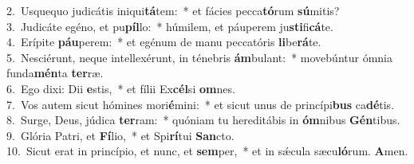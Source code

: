 {2.~}Usquequo judicátis iniqui\textbf{tá}tem:~* et fácies pecca\textbf{tó}rum \textbf{sú}mitis?\\
{3.~}Judicáte egéno, et pu\textbf{píl}lo:~* húmilem, et páuperem ju\textbf{sti}fi\textbf{cá}te.\\
{4.~}Erípite \textbf{páu}perem:~* et egénum de manu peccatóris \textbf{li}be\textbf{rá}te.\\
{5.~}Nesciérunt, neque intellexérunt, in ténebris \textbf{ám}bulant:~* movebúntur ómnia funda\textbf{mén}ta \textbf{ter}ræ.\\
{6.~}Ego dixi: Dii \textbf{e}stis,~* et fílii Ex\textbf{cél}si \textbf{om}nes.\\
{7.~}Vos autem sicut hómines mori\textbf{é}mini:~* et sicut unus de princípi\textbf{bus} ca\textbf{dé}tis.\\
{8.~}Surge, Deus, júdica \textbf{ter}ram:~* quóniam tu hereditábis in \textbf{óm}nibus \textbf{Gén}tibus.\\
{9.~}Glória Patri, et \textbf{Fí}lio,~* et Spi\textbf{rí}tui \textbf{San}cto.\\
{10.~}Sicut erat in princípio, et nunc, et \textbf{sem}per,~* et in sǽcula sæcu\textbf{ló}rum. \textbf{A}men.\\
